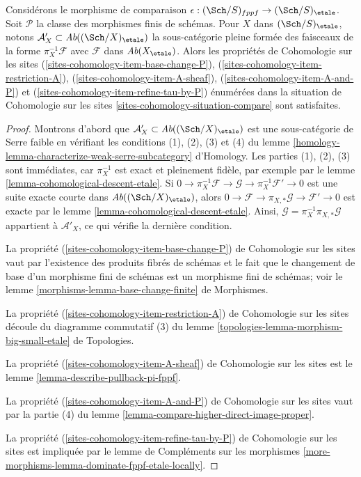 \begin{lemma}
\label{lemma-compare-fppf-etale}
Considérons le morphisme de comparaison
$\epsilon : (\Sch/S)_{fppf} \to (\Sch/S)_\etale$.
Soit $\mathcal{P}$ la classe des morphismes finis de schémas.
Pour $X$ dans $(\Sch/S)_\etale$, notons
$\mathcal{A}'_X \subset \textit{Ab}((\Sch/X)_\etale)$
la sous-catégorie pleine formée des faisceaux de la forme
$\pi_X^{-1}\mathcal{F}$ avec $\mathcal{F}$ dans $\textit{Ab}(X_\etale)$.
Alors les propriétés de Cohomologie sur les sites
(\ref{sites-cohomology-item-base-change-P}),
(\ref{sites-cohomology-item-restriction-A}),
(\ref{sites-cohomology-item-A-sheaf}),
(\ref{sites-cohomology-item-A-and-P}) et
(\ref{sites-cohomology-item-refine-tau-by-P})
énumérées dans la situation de Cohomologie sur les sites
\ref{sites-cohomology-situation-compare} sont satisfaites.
\end{lemma}

\begin{proof}
Montrons d'abord que $\mathcal{A}'_X \subset \textit{Ab}((\Sch/X)_\etale)$
est une sous-catégorie de Serre faible en vérifiant les conditions (1), (2), (3) et (4)
du lemme \ref{homology-lemma-characterize-weak-serre-subcategory} d'Homology.
Les parties (1), (2), (3) sont immédiates, car $\pi_X^{-1}$ est exact et
pleinement fidèle, par exemple par le lemme \ref{lemma-cohomological-descent-etale}. Si
$0 \to \pi_X^{-1}\mathcal{F} \to \mathcal{G} \to \pi_X^{-1}\mathcal{F}' \to 0$
est une suite exacte courte dans $\textit{Ab}((\Sch/X)_\etale)$,
alors $0 \to \mathcal{F} \to \pi_{X, *}\mathcal{G} \to \mathcal{F}' \to 0$
est exacte par le lemme \ref{lemma-cohomological-descent-etale}.
Ainsi, $\mathcal{G} = \pi_X^{-1}\pi_{X, *}\mathcal{G}$ appartient à
$\mathcal{A}'_X$, ce qui vérifie la dernière condition.

\medskip\noindent
La propriété (\ref{sites-cohomology-item-base-change-P}) de Cohomologie sur les sites vaut
par l'existence des produits fibrés de schémas
et le fait que le changement de base d'un morphisme fini de
schémas est un morphisme fini de schémas; voir le
lemme \ref{morphisms-lemma-base-change-finite} de Morphismes.

\medskip\noindent
La propriété (\ref{sites-cohomology-item-restriction-A}) de Cohomologie sur les sites
découle du diagramme commutatif (3) du
lemme \ref{topologies-lemma-morphism-big-small-etale} de Topologies.

\medskip\noindent
La propriété (\ref{sites-cohomology-item-A-sheaf}) de Cohomologie sur les sites est le
lemme \ref{lemma-describe-pullback-pi-fppf}.

\medskip\noindent
La propriété (\ref{sites-cohomology-item-A-and-P}) de Cohomologie sur les sites vaut par la
partie (4) du lemme \ref{lemma-compare-higher-direct-image-proper}.

\medskip\noindent
La propriété (\ref{sites-cohomology-item-refine-tau-by-P}) de Cohomologie sur les sites
est impliquée par le
lemme de Compléments sur les morphismes
\ref{more-morphisms-lemma-dominate-fppf-etale-locally}.
\end{proof}

